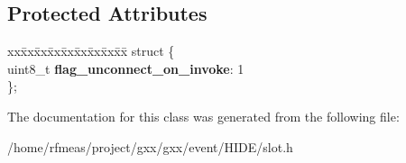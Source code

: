 \subsection*{Protected Attributes}
\begin{DoxyCompactItemize}
\item 
\begin{tabbing}
xx\=xx\=xx\=xx\=xx\=xx\=xx\=xx\=xx\=\kill
struct \{\\
\>uint8\_t {\bfseries flag\_unconnect\_on\_invoke}: 1\\
\}; \hypertarget{classgxx_1_1basic__slot_a9e4d31168626180fea20e5e1fffb4ecc}{}\label{classgxx_1_1basic__slot_a9e4d31168626180fea20e5e1fffb4ecc}
\\

\end{tabbing}\end{DoxyCompactItemize}


The documentation for this class was generated from the following file\+:\begin{DoxyCompactItemize}
\item 
/home/rfmeas/project/gxx/gxx/event/\+H\+I\+D\+E/slot.\+h\end{DoxyCompactItemize}
